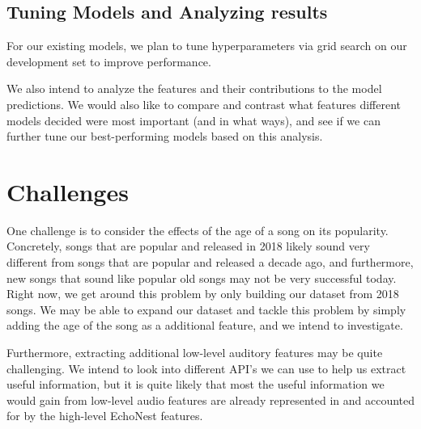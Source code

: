 \documentclass[journal]{IEEEtran}
\begin{document}
\subsection{Tuning Models and Analyzing results}
For our existing models, we plan to tune hyperparameters via grid search on our development set to improve performance.

We also intend to analyze the features and their contributions to the model predictions. We would also like to compare and contrast what features different models decided were most important (and in what ways), and see if we can further tune our best-performing models based on this analysis.

\section{Challenges}
One challenge is to consider the effects of the age of a song on its popularity. Concretely, songs that are popular and released in 2018 likely sound very different from songs that are popular and released a decade ago, and furthermore, new songs that sound like popular old songs may not be very successful today. Right now, we get around this problem by only building our dataset from 2018 songs. We may be able to expand our dataset and tackle this problem by simply adding the age of the song as a additional feature, and we intend to investigate.

Furthermore, extracting additional low-level auditory features may be quite challenging. We intend to look into different API's we can use to help us extract useful information, but it is quite likely that most the useful information we would gain from low-level audio features are already represented in and accounted for by the high-level EchoNest features.


\end{document}
